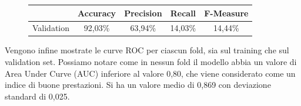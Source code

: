 \begin{figure}[H]
	\centering
	\begin{tabular}{lcccc}
		\toprule
		& \textbf{Accuracy} & \textbf{Precision} & \textbf{Recall} & 
		\textbf{F-Measure}  \\
		\midrule
		Validation	&  92,03\%	& 63,94\%	& 14,03\% &	14,44\% \\
		\bottomrule
	\end{tabular}
	\label{tab:mlp_cv_performance}
\end{figure}

Vengono infine mostrate le curve ROC per ciascun fold, sia sul training che 
sul validation set. Possiamo notare come in nessun fold il modello abbia un 
valore di Area Under Curve (AUC) inferiore al valore 0,80, che viene 
considerato come un indice di buone prestazioni. Si ha un valore medio di 
0,869 con deviazione standard di 0,025.

